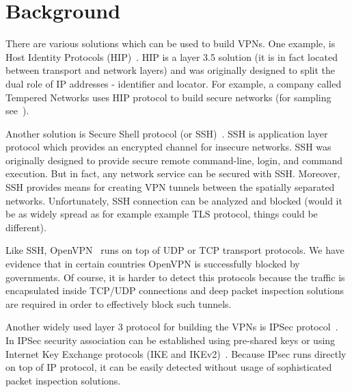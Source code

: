 \section{Background}
\label{section:background}

There are various solutions which can be used to build VPNs.
One example, is Host Identity Protocols (HIP)~\cite{hip}. 
HIP is a layer 3.5 solution (it is in fact located between transport
and network layers) and was originally designed to 
split the dual role of IP addresses - identifier and locator.
For example, a company called Tempered Networks uses HIP protocol
to build secure networks (for sampling see~\cite{temperednetworks}).

Another solution is Secure Shell protocol (or SSH)~\cite{ssh}. SSH is
application layer protocol which provides an encrypted channel for insecure
networks. SSH was originally designed to provide secure  
remote command-line, login, and command execution. But in fact, 
any network service can be secured with SSH. Moreover, SSH provides
means for creating VPN tunnels between the spatially separated networks.
Unfortunately, SSH connection can be analyzed and blocked (would it be as 
widely spread as for example example TLS protocol, things could be different).

Like SSH, OpenVPN~\cite{openvpn} runs on top of UDP or TCP transport protocols.
We have evidence that in certain countries OpenVPN is successfully blocked 
by governments. Of course, it is harder to detect this protocols because 
the traffic is encapsulated inside TCP/UDP connections and deep packet
inspection solutions are required in order to effectively block such tunnels.

Another widely used layer 3 protocol for building the VPNs is IPSec 
protocol~\cite{ipsec}. In IPSec security association can be established using 
pre-shared keys or using Internet Key Exchange protocols (IKE and IKEv2)~\cite{ike}.
Because IPsec runs directly on top of IP protocol, it can be easily detected without
usage of sophisticated packet inspection solutions.
  